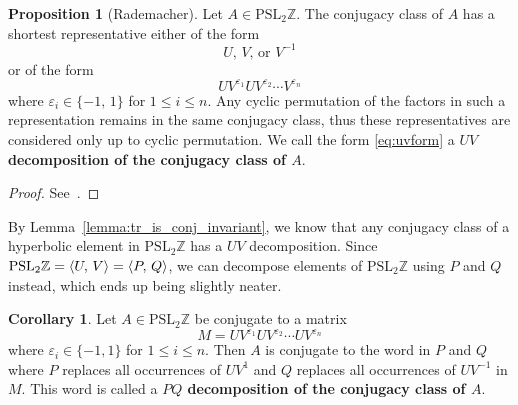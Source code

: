 \documentclass[12pt,twoside]{reedthesis}
\theoremstyle{definition}
\newtheorem{cor}[thm]{Corollary}
\newtheorem{prop}[thm]{Proposition}
\newcommand{\Z}{\mathbb{Z}}
\newcommand{\PSLZ}{\mathrm{PSL}_2{\Z}}
\newcommand{\defnphrase}[1]{\textbf{#1}}
\DeclarePairedDelimiter\ang{\langle}{\rangle}
\begin{document}
\begin{prop}[Rademacher]
  Let $A \in \PSLZ$.
  The conjugacy class of $A$ has a shortest representative either of the form
  \begin{equation}\label{eq:uvform_elliptic}
    \text{$U$, $V$, or $V^{-1}$}
  \end{equation}
  or of the form
  \begin{equation}\label{eq:uvform}
    U V^{\varepsilon_1} U V^{\varepsilon_2} \cdots V^{\varepsilon_{n}}
  \end{equation}
  where $\varepsilon_i \in \{-1,\, 1\}$ for $1 \leq i \leq n$.
  Any cyclic permutation of the factors in such a representation remains in the same conjugacy class, thus these representatives are considered only up to cyclic permutation.
  We call the form \eqref{eq:uvform} a \defnphrase{$UV$ decomposition of the conjugacy class of $A$}.
\end{prop}

\begin{proof}
  See~\cite[56--57]{rademacher1972}.
\end{proof}

By Lemma~\ref{lemma:tr_is_conj_invariant}, we know that any conjugacy class of a hyperbolic element in $\PSLZ$ has a $UV$ decomposition.
Since $\PSLZ = \ang{U,\, V} = \ang{P,\, Q}$, we can decompose elements of $\PSLZ$ using $P$ and $Q$ instead, which ends up being slightly neater.

\vspace{0.5em}  %
\begin{cor}\label{prop:pq_decomposition}
  Let $A \in \PSLZ$ be conjugate to a matrix
  \begin{equation*}
    M = UV^{\varepsilon_1} UV^{\varepsilon_2} \cdots UV^{\varepsilon_n}
  \end{equation*}
  where $\varepsilon_i \in \{-1, 1\}$ for $1 \leq i \leq n$.
  Then $A$ is conjugate to the word in $P$ and $Q$ where $P$ replaces all occurrences of $UV^1$ and $Q$ replaces all occurrences of $UV^{-1}$ in $M$.
  This word is called a \defnphrase{$PQ$ decomposition of the conjugacy class of $A$}.
\end{cor}
\end{document}
